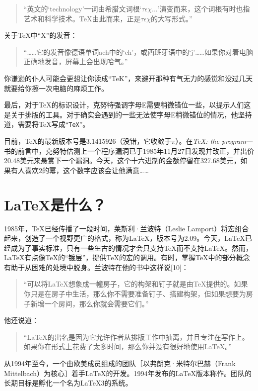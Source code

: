 \begin{quote}
    “英文的‘technology’一词由希腊文词根‘$ \tau\epsilon\chi...$’演变而来，这个词根有时也指艺术和科学技术。\TeX 由此而来，正是$ \tau\epsilon\chi$的大写形式。”
\end{quote}

关于\TeX 中“X”的发音：

\begin{quote}
    “……它的发音像德语单词ach中的‘ch’，或西班牙语中的‘j’……如果你对着电脑正确地发音，屏幕上会出现哈气。”
\end{quote}

你谦逊的仆人可能会更想让你读成“TeK”，来避开那种有气无力的感觉和没过几天就要给你擦一次电脑的麻烦工作。

最后，对于\TeX 的标识设计，克努特强调字母E需要稍微错位一些，以提示人们这是关于排版的工具。对于确实会遇到的一些无法使字母E稍微错位的情况，他坚持道，需要将\TeX 写成“\texttt{TeX}”。

目前，\TeX 的最新版本号是3.1415926（没错，它收敛于$\pi$）。在\textit{\TeX : the program}一书的前言中，克努特估测上一个程序漏洞已于1985年11月27日发现并改正，并出价20.48美元来悬赏下一个漏洞。今天，这个十六进制的金额停留在327.68美元，如果有人喜欢2的幂，这个数字应该会让他满意……

\section*{\LaTeX 是什么？}

1985年，\TeX 已经传播了一段时间，莱斯利·兰波特（Leslie Lamport）将宏组合起来，创造了一个视野更广的格式，称为\LaTeX ，版本号为2.09。今天，\LaTeX 已经成为了事实标准，只有一些玍古的情况才会只支持\TeX 而不支持\LaTeX 。然而，\LaTeX 有点像\TeX 的“镀层”，提供\TeX 的宏的调用。有时，掌握\TeX 中的部分概念有助于从困难的处境中脱身。兰波特在他的书中这样说[10]：%

\begin{quote}
    “可以将\LaTeX 想象成一幢房子，它的构架和钉子就是由\TeX 提供的。如果你只是在房子中生活，那么你不需要准备钉子、搭建构架，但如果想要为房子新增一个房间，那么你就会需要它们。”
\end{quote}

他还说道：

\begin{quote}
    “\LaTeX 的出名是因为它允许作者从排版工作中抽离，并且专注在写作上。如果你在形式上花费了太多时间，那么你并没有很好地使用\LaTeX 。”
\end{quote}

从1994年至今，一个由欧美成员组成的团队［以弗朗克·米特尔巴赫（Frank Mittelbach）为核心］着手\LaTeX 的开发。1994年发布的\LaTeX 版本称作\LaTeXe。团队的长期目标是孵化一个名为\LaTeX 3的系统。

